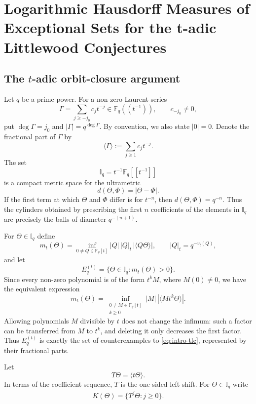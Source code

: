 \documentclass[11pt]{article}
\theoremstyle{remark}
\newcommand{\Iq}{\mathbb{I}_q}
\newcommand{\Et}{E_q^{(t)}}
\newcommand{\mt}{m_t}
\begin{document}
\section{Logarithmic Hausdorff Measures of Exceptional Sets for the t-adic Littlewood Conjectures}
\subsection{The $t$-adic orbit-closure argument}

Let $q$ be a prime power.  For a non-zero Laurent series
\[
 \Gamma=\sum_{j\geq -j_0}c_jt^{-j}\in\mathbb F_q((t^{-1})),
 \qquad c_{-j_0}\ne0,
\]
put $\deg\Gamma=j_0$ and $|\Gamma|=q^{\deg\Gamma}$. By convention,
we also state $|0|=0$. Denote the fractional part of $\Gamma$ by
\[
 \langle\Gamma\rangle:=\sum_{j\geq1}c_jt^{-j}.
\]
The set
\[
 \Iq=t^{-1}\mathbb F_q[[t^{-1}]]
\]
is a compact metric space for the ultrametric
\begin{equation} \label{eq:t-metric}
 d(\Theta,\Phi)=|\Theta-\Phi|.
\end{equation}
If the first term at which $\Theta$ and $\Phi$ differ is for
$t^{-n}$, then $d(\Theta,\Phi)=q^{-n}$.  Thus the cylinders obtained
by prescribing the first $n$ coefficients of the elements in $\Iq$
are precisely the balls of diameter $q^{-(n+1)}$.

For $\Theta\in\Iq$ define
\begin{equation} \label{eq:mt-definition}
 \mt(\Theta)
 =\inf_{0\ne Q\in\mathbb F_q[t]}
 |Q|\,|Q|_t\,|\langle Q\Theta\rangle|,
 \qquad |Q|_t=q^{-v_t(Q)},
\end{equation}
and let
\begin{equation} \label{eq:t-exceptional-set}
 \Et=\{\Theta\in\Iq:\mt(\Theta)>0\}.
\end{equation}
Since every non-zero polynomial is of the form $t^kM$, where
$M(0)\ne0$, we have the equivalent expression
\begin{equation} \label{eq:mt-equivalent}
 \mt(\Theta)
 =\inf_{\substack{0\ne M\in\mathbb F_q[t]\\ k\geq0}}
 |M|\,|\langle Mt^k\Theta\rangle|.
\end{equation}
Allowing polynomials $M$ divisible by $t$ does not change the
infimum: such a factor can be transferred from $M$ to $t^k$, and
deleting it only decreases the first factor.  Thus $\Et$ is exactly
the set of counterexamples to \eqref{eq:intro-tlc}, represented by
their fractional parts.

Let
\begin{equation} \label{eq:t-shift}
 T\Theta=\langle t\Theta\rangle.
\end{equation}
In terms of the coefficient sequence, $T$ is the one-sided left
shift.  For $\Theta\in\Iq$ write
\begin{equation} \label{eq:t-orbit-closure}
 K(\Theta)=\overline{\{T^j\Theta:j\geq0\}}.
\end{equation}
\end{document}
